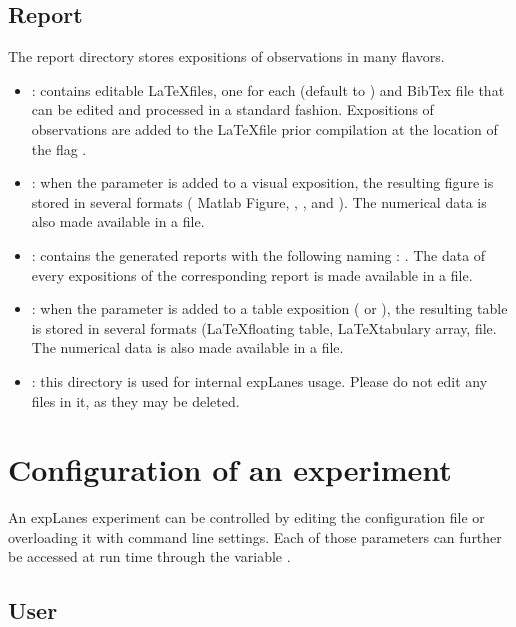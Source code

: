\documentclass[a4paper,fleqn]{tufte-handout}
\newcommand{\explanes}{\textsf{expLanes} }
\begin{document}
\subsection{Report}

The report directory stores expositions of observations in many flavors.

\begin{itemize}
\item \textbf{}: contains editable \LaTeX files, one for each  (default to ) and BibTex file that can be edited and processed in a standard fashion. Expositions of observations are added to the \LaTeX file prior compilation at the location of the flag .
\item \textbf{}: when the  parameter is added to a visual exposition, the resulting figure is stored in several formats ( Matlab Figure, , , and ). The numerical data is also made available in a  file. 
\item \textbf{}: contains the generated reports with the following naming : . The data of every expositions of the corresponding report is made available in a  file.
\item \textbf{}:  when the  parameter is added to a table exposition ( or ), the resulting table is stored in several formats (\LaTeX floating table, \LaTeX tabulary array,  file. The numerical data is also made available in a  file.
\item \textbf{}: this directory is used for internal \explanes usage. Please do not edit any files in it, as they may be deleted.
\end{itemize}


\section{Configuration of an experiment}

An \explanes experiment can be controlled by editing the configuration file or overloading it with command line settings. Each of those parameters can further be accessed at run time through the variable .

\subsection{User}
\end{document}
